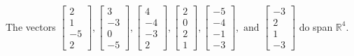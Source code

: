 \begin{exercise}
\begin{exerciseStatement}
  \end{exerciseStatement}
  \begin{exerciseAnswer}
   The vectors \(\left[\begin{array}{r}
2 \\
1 \\
-5 \\
2
\end{array}\right] , \left[\begin{array}{r}
3 \\
-3 \\
0 \\
-5
\end{array}\right] , \left[\begin{array}{r}
4 \\
-4 \\
-3 \\
2
\end{array}\right] , \left[\begin{array}{r}
2 \\
0 \\
2 \\
1
\end{array}\right] , \left[\begin{array}{r}
-5 \\
-4 \\
-1 \\
-3
\end{array}\right] , \text{ and } \left[\begin{array}{r}
-3 \\
2 \\
1 \\
-3
\end{array}\right]\) 
  	 do  
	span \(\mathbb{R}^4\).
  


  \end{exerciseAnswer}
\end{exercise}